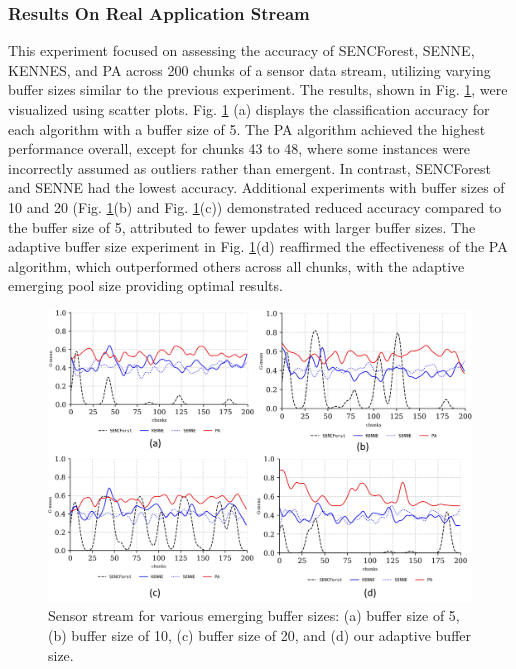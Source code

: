 \subsubsection{Results On Real Application Stream}
\label{sec:sensor}
This experiment focused on assessing the accuracy of SENCForest, SENNE, KENNES, and PA across 200 chunks of a sensor data stream, utilizing varying buffer sizes similar to the previous experiment. The results, shown in Fig. \ref{fig:res2}, were visualized using scatter plots. Fig. \ref{fig:res2} (a) displays the classification accuracy for each algorithm with a buffer size of 5. The PA algorithm achieved the highest performance overall, except for chunks 43 to 48, where some instances were incorrectly assumed as outliers rather than emergent. In contrast, SENCForest and SENNE had the lowest accuracy. Additional experiments with buffer sizes of 10 and 20 (Fig. \ref{fig:res2}(b) and Fig. \ref{fig:res2}(c)) demonstrated reduced accuracy compared to the buffer size of 5, attributed to fewer updates with larger buffer sizes. The adaptive buffer size experiment in Fig. \ref{fig:res2}(d) reaffirmed the effectiveness of the PA algorithm, which outperformed others across all chunks, with the adaptive emerging pool size providing optimal results.

\begin{figure}[!ht]
	\centering
	\includegraphics[width=1\linewidth]{5_Emerging/images/res2.png}
	\caption{Sensor stream for various emerging buffer sizes: (a) buffer size of 5, (b) buffer size of 10, (c) buffer size of 20, and (d) our adaptive buffer size.}
	\label{fig:res2}
\end{figure}				


